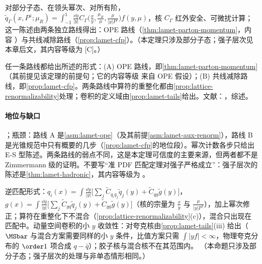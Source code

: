 \begin{theorem}\label{thm:lattice-lamet}
对部分子态、在领头幂次、对所有阶，$\tilde q_\Gamma(x,P^z;\mu_R)=\int_{-1}^1\frac{\dd y}{|y|}C_\Gamma\big(\frac xy,\frac{\mu_R}\mu,\frac\mu{|y|P^z}\big)f(y,\mu)$，核 $C_\Gamma$ 红外安全、可微扰计算；这一陈述由两条独立路线得出：OPE 路线（\cref{thm:lamet-parton-momentum}，内容 \tagA）与共线减除路线（\cref{prop:lamet-cfp}）。（本定理只涉及部分子态；强子层次见本章后文，其内容等级为 [C]。）
\end{theorem}

\begin{proofsketch}
任一条路线都给出所述的形式：(A) OPE 路线，即\cref{thm:lamet-parton-momentum}（其前提见该定理的前提句；它的内容等级 \tagA 来自 OPE 假设）；(B) 共线减除路线，即\cref{prop:lamet-cfp}。两条路线中算符的重整化都由\cref{prop:lattice-renormalizability}处理；卷积的定义域由\cref{prop:lamet-tails}给出。文献：\cite{IzubuchiEtAl2018,Ma:2014jla,MaQiu2018,JiEtAl2021}，综述\cite{Constantinou:2020hdm}。
\end{proofsketch}

\paragraph{地位与缺口}
\tagA；瓶颈：路线 A 是\cref{asm:lamet-ope}（及其前提\cref{asm:lamet-aux-renorm}），路线 B 是光锥规范中只有概要的几步（\cref{prop:lamet-cfp}的地位段）。幂次计数各步只给出 E-S 型陈述。两条路线的弱点不同，这是本定理可信度的主要来源，但两者都不是 Zimmermann 级的证明。不要写“准 PDF 匹配定理对强子严格成立”：强子层次的陈述是\cref{thm:lamet-hadronic}，其内容等级为 \tagC。

\begin{proposition}\label{prop:lamet-gluon-singlet}
逆匹配形式\cite{JiEtAl2021}：$q_i(x)=\int\frac{\dd y}{|y|}\big[\sum_j\tilde C_{q_iq_j}\tilde q_j(y)+\tilde C_{qg}\tilde g(y)\big]$，$g(x)=\int\frac{\dd y}{|y|}\big[\sum_j\tilde C_{gq}\tilde q_j(y)+\tilde C_{gg}\tilde g(y)\big]$（核的宗量为 $\frac xy$ 与 $\frac\mu{|y|P^z}$），加上幂次修正；算符在重整化下不混合（\cref{prop:lattice-renormalizability}(c)），混合只出现在匹配中。动量空间卷积的小 $y$ 收敛性：对夸克核由\cref{prop:lamet-tails}(iii) 给出（$\MSbar$ 与混合方案需要同样的小 $y$ 条件，比值方案只需 $\int|yf|<\infty$，物理夸克分布的 $\order1$ 项合成 $q-\bar q$）；胶子核与混合核不在其范围内。
（本命题只涉及部分子态；强子层次的处理与非单态情形相同。）
\end{proposition}

